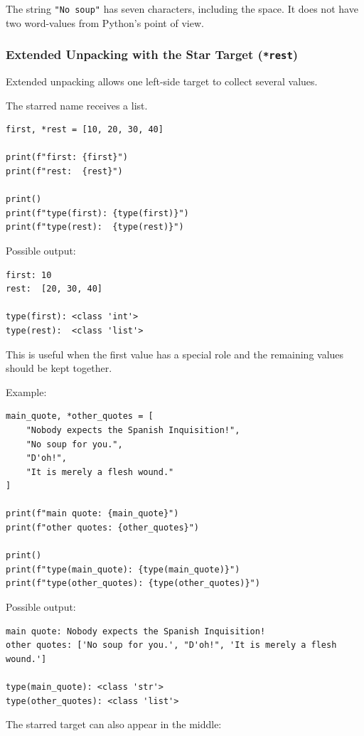 The string \texttt{"No soup"} has seven characters, including the space. It does not have two word-values from Python's point of view.

\subsubsection{Extended Unpacking with the Star Target (\texttt{*rest})}

Extended unpacking allows one left-side target to collect several values.

The starred name receives a list.

\begin{verbatim}
first, *rest = [10, 20, 30, 40]

print(f"first: {first}")
print(f"rest:  {rest}")

print()
print(f"type(first): {type(first)}")
print(f"type(rest):  {type(rest)}")
\end{verbatim}

Possible output:

\begin{verbatim}
first: 10
rest:  [20, 30, 40]

type(first): <class 'int'>
type(rest):  <class 'list'>
\end{verbatim}

This is useful when the first value has a special role and the remaining values should be kept together.

Example:

\begin{verbatim}
main_quote, *other_quotes = [
    "Nobody expects the Spanish Inquisition!",
    "No soup for you.",
    "D'oh!",
    "It is merely a flesh wound."
]

print(f"main quote: {main_quote}")
print(f"other quotes: {other_quotes}")

print()
print(f"type(main_quote): {type(main_quote)}")
print(f"type(other_quotes): {type(other_quotes)}")
\end{verbatim}

Possible output:

\begin{verbatim}
main quote: Nobody expects the Spanish Inquisition!
other quotes: ['No soup for you.', "D'oh!", 'It is merely a flesh wound.']

type(main_quote): <class 'str'>
type(other_quotes): <class 'list'>
\end{verbatim}

The starred target can also appear in the middle:

